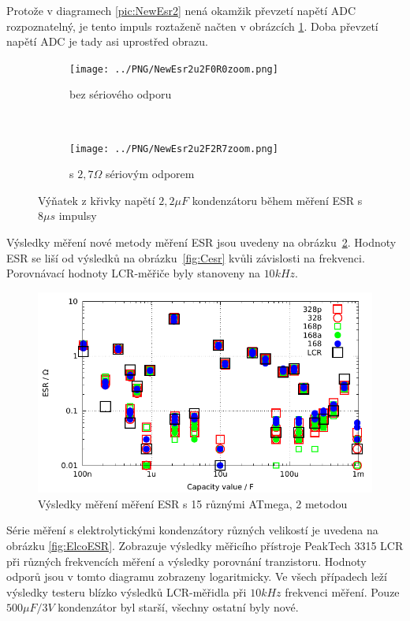 Protože v diagramech \ref{pic:NewEsr2} nená okamžik převzetí napětí ADC rozpoznatelný,
je tento impuls roztaženě načten v obrázcích \ref{pic:NewEsr2zoom}.
Doba převzetí napětí ADC je tady asi uprostřed obrazu.

\begin{figure}[H]
  \begin{subfigure}[b]{.5\textwidth}
    \centering
    \texttt{[image: ../PNG/NewEsr2u2F0R0zoom.png]}
    \caption{bez sériového odporu}
  \end{subfigure}
  ~
  \begin{subfigure}[b]{.5\textwidth}
    \centering
    \texttt{[image: ../PNG/NewEsr2u2F2R7zoom.png]}
    \caption{s \(2,7\Omega\) sériovým odporem}
  \end{subfigure}
  \caption{Výňatek z křivky napětí \(2,2\mu F\) kondenzátoru během měření ESR s \(8\mu s\) impulsy}
  \label{pic:NewEsr2zoom}
\end{figure}
 

Výsledky měření nové metody měření ESR jsou uvedeny na obrázku~\ref{fig:Cesr2}.
Hodnoty ESR se liší od výsledků na obrázku~\ref{fig:Cesr} kvůli závislosti na frekvenci.
Porovnávací hodnoty  LCR-měřiče byly stanoveny na \(10kHz\).

\begin{figure}[H]
\centering
 \includegraphics[width=.93\textwidth]{../GNU/Cesr2.pdf}
\caption{Výsledky měření měření ESR s 15 různými ATmega, 2 metodou}
\label{fig:Cesr2}
\end{figure}

Série měření s elektrolytickými kondenzátory různých velikostí je uvedena na obrázku \ref{fig:ElcoESR}.
Zobrazuje výsledky měřicího přístroje PeakTech 3315 LCR při různých frekvencích měření a
výsledky porovnání tranzistoru.
Hodnoty odporů jsou v tomto diagramu zobrazeny logaritmicky.
Ve všech případech leží výsledky testeru blízko výsledků LCR-měřidla při \(10kHz\) frekvenci měření. 
Pouze \(500\mu F/3V\) kondenzátor byl starší, všechny ostatní byly nové.

